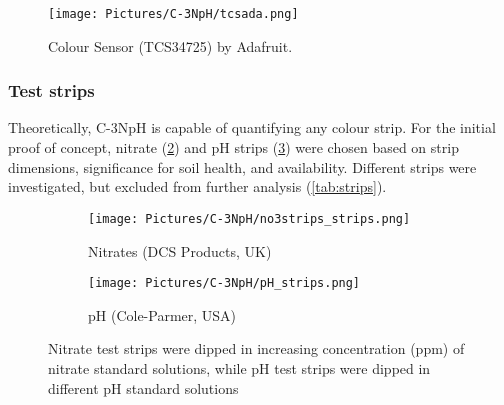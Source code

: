 \begin{figure}[h!]
	\centering
	\texttt{[image: Pictures/C-3NpH/tcsada.png]}
	\captionsetup{justification = centering}
	\caption{Colour Sensor (TCS34725) by Adafruit. \cite{ada}}
	\label{fig:tcsada}
\end{figure}

\subsubsection{Test strips} \label{sec:ts_c3nph}

Theoretically, C-3NpH is capable of quantifying any colour strip. For the initial proof of concept, nitrate (\cref{subfig:no3strips}) and pH strips (\cref{subfig:pHstrips}) were chosen based on strip dimensions, significance for soil health, and availability. Different strips were investigated, but excluded from further analysis (\cref{tab:strips}). 

\begin{figure}[h!]
	\centering
	\begin{subfigure}[b]{0.6\linewidth} 
		\centering
		\texttt{[image: Pictures/C-3NpH/no3strips\_strips.png]}
		\caption{Nitrates (DCS Products, UK)} 
		\label{subfig:no3strips}
	\end{subfigure}
	\begin{subfigure}[b]{0.35\linewidth}
	\centering
		\texttt{[image: Pictures/C-3NpH/pH\_strips.png]}
		\caption{pH (Cole-Parmer, USA)} 
		\label{subfig:pHstrips}
	\end{subfigure}
	\captionsetup{justification = centering}
	\caption{Nitrate test strips were dipped in increasing concentration (ppm) of nitrate standard solutions, while pH test strips were dipped in different pH standard solutions}
	\label{fig:teststrips}
\end{figure}  

